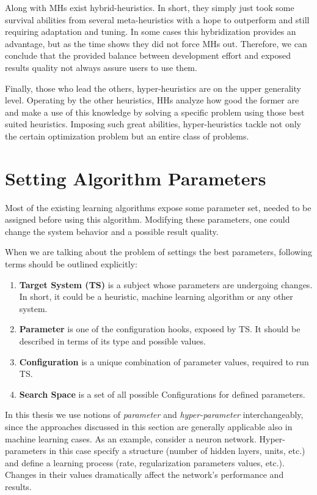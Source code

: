 Along with MHs exist hybrid-heuristics. In short, they simply just took some survival abilities from several meta-heuristics with a hope to outperform and still requiring adaptation and tuning. In some cases this hybridization provides an advantage, but as the time shows they did not force MHs out. Therefore, we can conclude that the provided balance between development effort and exposed results quality not always assure users to use them.

Finally, those who lead the others, hyper-heuristics are on the upper generality level. 
Operating by the other heuristics, HHs analyze how good the former are and make a use of this knowledge by solving a specific problem using those best suited heuristics. Imposing such great abilities, hyper-heuristics tackle not only the certain optimization problem but an entire class of problems.


\section{Setting Algorithm Parameters}\label{bg: section Parameters Setting}
Most of the existing learning algorithms expose some parameter set, needed to be assigned before using this algorithm. Modifying these parameters, one could change the system behavior and a possible result quality.

When we are talking about the problem of settings the best parameters, following terms should be outlined explicitly:
\begin{enumerate}
	\item \textbf{Target System (TS)} is a subject whose parameters are undergoing changes. In short, it could be a heuristic, machine learning algorithm or any other system.
	\item \textbf{Parameter} is one of the configuration hooks, exposed by TS. It should be described in terms of its type and possible values.
	\item \textbf{Configuration} is a unique combination of parameter values, required to run TS.
	\item \textbf{Search Space} is a set of all possible Configurations for defined parameters.
\end{enumerate}

In this thesis we use notions of \emph{parameter} and \emph{hyper-parameter} interchangeably, since the approaches discussed in this section are generally applicable also in machine learning cases. As an example, consider a neuron network. Hyper-parameters in this case specify a structure (number of hidden layers, units, etc.) and define a learning process (rate, regularization parameters values, etc.). Changes in their values dramatically affect the network's performance and results.

